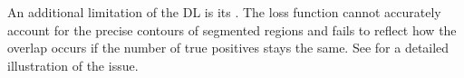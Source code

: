 An additional limitation of the \ac{DL} is its . The loss function cannot accurately account for the precise contours of segmented regions and fails to reflect how the overlap occurs if the number of true positives stays the same. See  for a detailed illustration of the issue.
\begin{figure}[H]%
  \centering

\end{figure}
